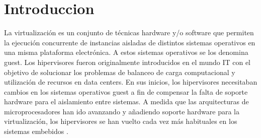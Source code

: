 \chapter{Introduccion}
\label{ch:introduccion:primera}
La virtualización es un conjunto de técnicas hardware y/o software que permiten la ejecución
concurrente de instancias aisladas de distintos sistemas operativos en una misma plataforma
electrónica. A estos sistemas operativos se los denomina guest.
Los hipervisores fueron originalmente introducidos en el mundo IT con el objetivo de solucionar los problemas de
balanceo de carga computacional y utilización de recursos en data centers. En sus inicios, los hipervisores necesitaban cambios en los sistemas operativos guest a fin de compensar la falta de soporte hardware para el aislamiento
entre sistemas. A medida que las arquitecturas de microprocesadores han ido avanzando y añadiendo
soporte hardware para la virtualización, los hipervisores se han vuelto cada vez más habituales en los
sistemas embebidos \cite{EmbeddedWorld2018}.

